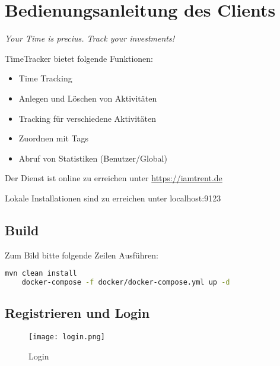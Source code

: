 
\section{Bedienungsanleitung des Clients}

\begin{center}
	\textit{Your Time is precius. \newline Track your investments!}
\end{center}


TimeTracker bietet folgende Funktionen:
\begin{itemize}
	\item Time Tracking
	\item Anlegen und Löschen von Aktivitäten %
	\item Tracking für verschiedene Aktivitäten
	\item Zuordnen mit Tags
	\item Abruf von Statistiken (Benutzer/Global)
\end{itemize}


Der Dienst ist online zu erreichen unter \url{https://iamtrent.de}

Lokale Installationen sind zu erreichen unter localhost:9123

\subsection{Build}

Zum Bild bitte folgende Zeilen Ausführen:
\begin{lstlisting}[language=bash]
	mvn clean install
	docker-compose -f docker/docker-compose.yml up -d
\end{lstlisting}

\subsection{Registrieren und Login }
 
 \begin{figure}[H]
 	\hspace{-1.5cm}
 	\texttt{[image: login.png]}
 	\caption{Login}
 	\label{fig:login}
 \end{figure}

